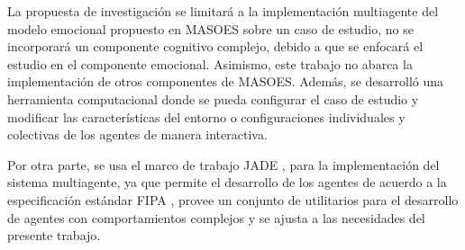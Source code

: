 
La propuesta de investigación se limitará a la implementación multiagente del
modelo emocional propuesto en MASOES sobre un caso de estudio, no se incorporará
un componente cognitivo complejo, debido a que se enfocará el estudio en el
componente emocional. Asimismo, este trabajo no abarca la implementación de
otros componentes de MASOES.
Además, se desarrolló una herramienta computacional donde se pueda configurar el caso de estudio y modificar
las características del entorno o configuraciones individuales y colectivas de
los agentes de manera interactiva.

Por otra parte, se usa el marco de trabajo JADE , para la implementación del sistema multiagente, ya que permite el
desarrollo de los agentes de acuerdo a la especificación estándar FIPA
, provee
un conjunto de utilitarios para el desarrollo de agentes con comportamientos complejos y
se ajusta a las necesidades del presente trabajo.
